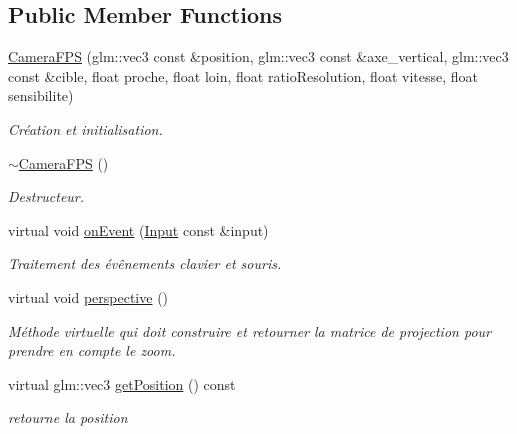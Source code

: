 \subsection*{Public Member Functions}
\begin{DoxyCompactItemize}
\item 
\hypertarget{classCameraFPS_a052e711986b70b0f34fb85f72c6818c9}{\hyperlink{classCameraFPS_a052e711986b70b0f34fb85f72c6818c9}{Camera\-F\-P\-S} (glm\-::vec3 const \&position, glm\-::vec3 const \&axe\-\_\-vertical, glm\-::vec3 const \&cible, float proche, float loin, float ratio\-Resolution, float vitesse, float sensibilite)}\label{classCameraFPS_a052e711986b70b0f34fb85f72c6818c9}

\begin{DoxyCompactList}\small\item\em Création et initialisation. \end{DoxyCompactList}\item 
\hypertarget{classCameraFPS_a2cf832c958d3e5a630539ea864b484dd}{\hyperlink{classCameraFPS_a2cf832c958d3e5a630539ea864b484dd}{$\sim$\-Camera\-F\-P\-S} ()}\label{classCameraFPS_a2cf832c958d3e5a630539ea864b484dd}

\begin{DoxyCompactList}\small\item\em Destructeur. \end{DoxyCompactList}\item 
\hypertarget{classCameraFPS_a1a051bc9f334ec12dc43fa16f6dd204c}{virtual void \hyperlink{classCameraFPS_a1a051bc9f334ec12dc43fa16f6dd204c}{on\-Event} (\hyperlink{classInput}{Input} const \&input)}\label{classCameraFPS_a1a051bc9f334ec12dc43fa16f6dd204c}

\begin{DoxyCompactList}\small\item\em Traitement des évênements clavier et souris. \end{DoxyCompactList}\item 
\hypertarget{classCameraFPS_a09b8ff24683ec75c107fce3e502eea1f}{virtual void \hyperlink{classCameraFPS_a09b8ff24683ec75c107fce3e502eea1f}{perspective} ()}\label{classCameraFPS_a09b8ff24683ec75c107fce3e502eea1f}

\begin{DoxyCompactList}\small\item\em Méthode virtuelle qui doit construire et retourner la matrice de projection pour prendre en compte le zoom. \end{DoxyCompactList}\item 
\hypertarget{classCameraFPS_a46be704d8fc6c8c25f9e6d093916affb}{virtual glm\-::vec3 \hyperlink{classCameraFPS_a46be704d8fc6c8c25f9e6d093916affb}{get\-Position} () const }\label{classCameraFPS_a46be704d8fc6c8c25f9e6d093916affb}

\begin{DoxyCompactList}\small\item\em retourne la position \end{DoxyCompactList}\end{DoxyCompactItemize}
